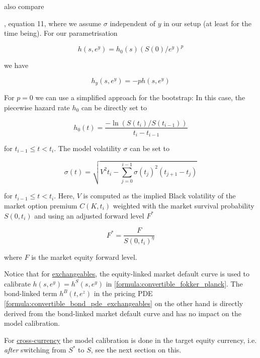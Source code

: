 also compare {\cite{Andersen_Buffum_2002}, equation 11, where we assume $\sigma$ independent of $y$ in our setup (at
  least for the time being). For our parametrisation

\begin{equation}
  h(s,e^y) = h_0(s) ( S(0) / e^y )^p
\end{equation}

we have

\begin{equation}
  h_y(s,e^y) = -p h(s,e^y)
\end{equation}

For $p=0$ we can use a simplified approach for the bootstrap: In this case, the piecewise hazard rate $h_0$ can be
directly set to

\begin{equation}\label{formula:convertible_bondmatch_p0}
  h_0(t) = \frac{ -\ln (S(t_i) / S(t_{i-1}))}{t_i-t_{i-1}}
\end{equation}

for $t_{i-1} \leq t < t_i$. The model volatility $\sigma$ can be set to

\begin{equation}\label{formula:convertible_equitymatch_p0}
  \sigma(t) = \sqrt{ V^2 t_i - \sum_{j=0}^{i-1} \sigma(t_j)^2 (t_{j+1} - t_j) }
\end{equation}

for $t_{i-1} \leq t < t_i$. Here, $V$ is computed as the implied Black volatility of the market option premium
$C(K,t_i)$ weighted with the market survival probability $S(0,t_i)$ and using an adjusted forward level $F^*$

\begin{equation}
  F^* = \frac{F}{S(0,t_i)^\eta}
\end{equation}

where $F$ is the market equity forward level.

Notice that for \underline{exchangeables}, the equity-linked market default curve is used to calibrate
$h(s,e^y) = h^S(s,e^y)$ in \ref{formula:convertible_fokker_planck}. The bond-linked term $h^B(t,e^z)$ in the pricing PDE
\ref{formula:convertible_bond_pde_exchangeables} on the other hand is directly derived from the bond-linked market
default curve and has no impact on the model calibration.

For \underline{cross-currency} the model calibration is done in the target equity currency, i.e. {\em after} switching
from $S^*$ to $S$, see the next section on this.

}
